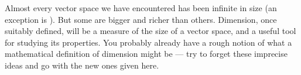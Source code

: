 %
\begin{introduction}
\begin{para}Almost every vector space we have encountered has been infinite in size (an exception is ).  But some are bigger and richer than others.  Dimension, once suitably defined, will be a measure of the size of a vector space, and a useful tool for studying its properties.  You probably already have a rough notion of what a mathematical definition of dimension might be --- try to forget these imprecise ideas and go with the new ones given here.\end{para}
\end{introduction}
%

